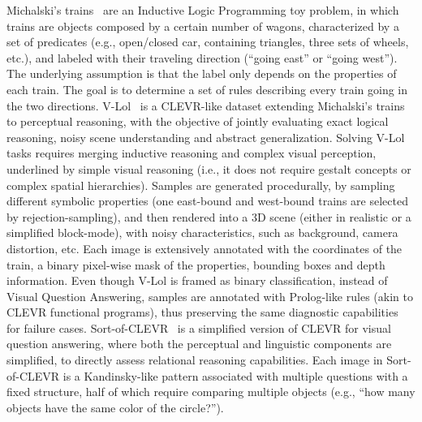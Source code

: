 Michalski's trains~\cite{larson1977inductive} are an Inductive Logic Programming toy problem, in which trains are objects composed by a certain number of wagons, characterized by a set of predicates (e.g., open/closed car, containing triangles, three sets of wheels, etc.), and labeled with their traveling direction (``going east'' or ``going west''). The underlying assumption is that the label only depends on the properties of each train. The goal is to determine a set of rules describing every train going in the two directions. 
V-Lol~\cite{helff2023v} is a CLEVR-like dataset extending Michalski's trains to perceptual reasoning, with the objective of jointly evaluating exact logical reasoning, noisy scene understanding and abstract generalization.
Solving V-Lol tasks requires merging inductive reasoning and complex visual perception, underlined by simple visual reasoning (i.e., it does not require gestalt concepts or complex spatial hierarchies).
Samples are generated procedurally, by sampling different symbolic properties (one east-bound and west-bound trains are selected by rejection-sampling), and then rendered into a 3D scene (either in realistic or a simplified block-mode), with noisy characteristics, such as background, camera distortion, etc.
Each image is extensively annotated with the coordinates of the train, a binary pixel-wise mask of the properties, bounding boxes and depth information.
Even though V-Lol is framed as binary classification, instead of Visual Question Answering, samples are annotated with Prolog-like rules (akin to CLEVR functional programs), thus preserving the same diagnostic capabilities for failure cases.
Sort-of-CLEVR~\cite{santoro2017simple} is a simplified version of CLEVR for visual question answering, where both the perceptual and linguistic components are simplified, to directly assess relational reasoning capabilities. Each image in Sort-of-CLEVR is a Kandinsky-like pattern associated with multiple questions with a fixed structure, half of which require comparing multiple objects (e.g., ``how many objects have the same color of the circle?''). 

